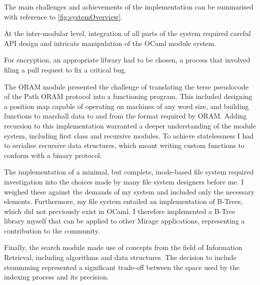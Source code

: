\documentclass[12pt,a4paper,twoside,openright]{report}
\begin{document}
The main challenges and achievements of the implementation can be summarised with reference to \cref{fig:systemOverview}.

At the inter-modular level, integration of all parts of the system required careful API design and intricate manipulation of the OCaml module system.

For encryption, an appropriate library had to be chosen, a process that involved filing a pull request to fix a critical bug.

The ORAM module presented the challenge of translating the terse pseudocode of the Path ORAM protocol into a functioning program. This included designing a position map capable of operating on machines of any word size, and building functions to marshall data to and from the format required by ORAM. Adding recursion to this implementation warranted a deeper understanding of the module system, including first class and recursive modules. To achieve statelessness I had to serialise recursive data structures, which meant writing custom functions to conform with a binary protocol.

The implementation of a minimal, but complete, inode-based file system required investigation into the choices made by many file system designers before me. I weighed these against the demands of my system and included only the necessary elements. Furthermore, my file system entailed an implementation of B-Trees, which did not previously exist in OCaml. I therefore implemented a B-Tree library myself that can be applied to other Mirage applications, representing a contribution to the community.

Finally, the search module made use of concepts from the field of Information Retrieval, including algorithms and data structures. The decision to include stemmming represented a significant trade-off between the space used by the indexing process and its precision.
\end{document}
